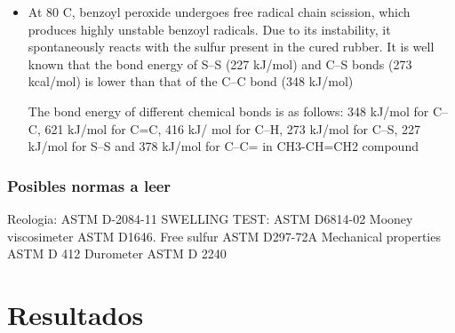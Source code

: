 \begin{itemize}
\item At 80 C, benzoyl peroxide undergoes free
radical chain scission, which produces highly unstable
benzoyl radicals. Due to its instability, it spontaneously
reacts with the sulfur present in the cured rubber. It is well
known that the bond energy of S–S (227 kJ/mol) and C–S
bonds (273 kcal/mol) is lower than that of the C–C bond
(348 kJ/mol)

The bond energy of different chemical bonds is as
follows: 348 kJ/mol for C–C, 621 kJ/mol for C=C, 416 kJ/
mol for C–H, 273 kJ/mol for C–S, 227 kJ/mol for S–S and
378 kJ/mol for C–C= in CH3-CH=CH2 compound

\end{itemize}

\subsection{Posibles normas a leer}

Reologia: ASTM D-2084-11
SWELLING TEST: ASTM D6814-02
Mooney viscosimeter ASTM D1646.
Free sulfur ASTM D297-72A
Mechanical properties ASTM D 412
Durometer ASTM D 2240 


\chapter{Resultados}


